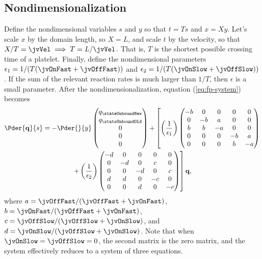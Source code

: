 \subsection{Nondimensionalization}
\label{sec:nondim}

Define the nondimensional variables $s$ and $y$ so that $t = Ts$ and
$x = Xy$. Let's scale $x$ by the domain length, so $X = L$, and scale
$t$ by the velocity, so that $X/T = \jvVel \implies T = L/\jvVel$. That
is, $T$ is the shortest possible crossing time of a platelet. Finally,
define the nondimensional parameters
$\epsilon_1 = 1/(T(\jvOnFast + \jvOffFast))$ and
$\epsilon_2 = 1/(T(\jvOnSlow + \jvOffSlow))$. If the sum of the relevant
reaction rates is much larger than $1/T$, then $\epsilon$ is a small
parameter. After the nondimensionalization, equation
(\ref{eq:fp-system}) becomes
\begin{multline}
  \label{eq:nd-system}
  \Pder{\mathbf{q}}{s} = -\Pder{}{y}
  \begin{pmatrix}
    q_{\stateUnboundNew} \\ q_{\stateUnboundOld} \\ 0 \\ 0 \\ 0
  \end{pmatrix}
  + \left[\left(\frac{1}{\epsilon_1}\right) 
  \begin{pmatrix}
    - b & 0 & 0 & 0 & 0 \\
    0 & - b & a & 0 & 0 \\
    b & b & - a & 0 & 0 \\
    0 & 0 & 0 & - b & a \\
    0 & 0 & 0 & b & - a
  \end{pmatrix} \right.
  \\
  \left. + \left(\frac{1}{\epsilon_2}\right)
  \begin{pmatrix}
    - d & 0 & 0 & 0 & 0 \\
    0 & - d & 0 & c & 0 \\
    0 & 0 & - d & 0 & c \\
    d & d & 0 & - c & 0 \\
    0 & 0 & d & 0 & - c
  \end{pmatrix}\right]
  \mathbf{q},
\end{multline}
where $a = \jvOffFast/(\jvOffFast + \jvOnFast)$,
$b = \jvOnFast/(\jvOffFast + \jvOnFast)$,
$c = \jvOffSlow/(\jvOffSlow + \jvOnSlow)$, and
$d = \jvOnSlow/(\jvOffSlow + \jvOnSlow)$. Note that when
$\jvOnSlow = \jvOffSlow = 0$, the second matrix is the zero matrix, and
the system effectively reduces to a system of three equations.

